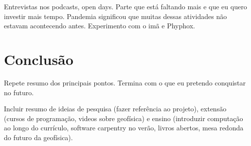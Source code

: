 \documentclass[10pt,a4paper,oneside]{book}
\begin{document}
Entrevistas nos podcasts, open days.
Parte que está faltando mais e que eu quero investir mais tempo.
Pandemia significou que muitas dessas atividades não estavam acontecendo antes.
Experimento com o imã e Phyphox.


\chapter{Conclusão}
\label{cap_conclusao}

Repete resumo dos principais pontos.
Termina com o que eu pretendo conquistar no futuro.

Incluir resumo de ideias de pesquisa (fazer referência ao projeto),
extensão (cursos de programação, videos sobre geofísica) e ensino (introduzir
computação ao longo do currículo, software carpentry no verão, livros abertos,
mesa redonda do futuro da geofísica).

\backmatter


\end{document}
